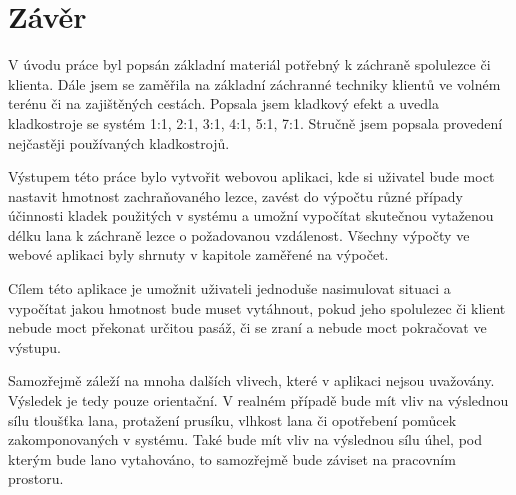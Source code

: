 \chapter*{Závěr}
\fancyhead{}
\def\figurename{Obr.} %
\def\tablename{Tab.} %
\def\figureautorefname{obr.} %
\def\tableautorefname{tab.} %
\def\chapterautorefname{kapitola} %

V úvodu práce byl popsán základní materiál potřebný k záchraně spolulezce či klienta. Dále jsem se zaměřila na základní záchranné techniky klientů ve volném terénu či na zajištěných cestách. Popsala jsem kladkový efekt a uvedla kladkostroje se systém 1:1, 2:1, 3:1, 4:1, 5:1, 7:1. Stručně jsem popsala provedení nejčastěji používaných kladkostrojů. 

Výstupem této práce bylo vytvořit webovou aplikaci, kde si uživatel bude moct nastavit hmotnost zachraňovaného lezce, zavést do výpočtu různé případy účinnosti kladek použitých v systému a umožní vypočítat skutečnou vytaženou délku lana k záchraně lezce o požadovanou vzdálenost. Všechny výpočty ve webové aplikaci byly shrnuty v kapitole zaměřené na výpočet.

Cílem této aplikace je umožnit uživateli jednoduše nasimulovat situaci a vypočítat jakou hmotnost bude muset vytáhnout, pokud jeho spolulezec či klient nebude moct překonat určitou pasáž, či se zraní a nebude moct pokračovat ve výstupu. 

Samozřejmě záleží na mnoha dalších vlivech, které v aplikaci nejsou uvažovány. Výsledek je tedy pouze orientační. V realném případě bude mít vliv na výslednou sílu tloušťka lana, protažení prusíku, vlhkost lana či opotřebení pomůcek zakomponovaných v systému. Také bude mít vliv na výslednou sílu úhel, pod kterým bude lano vytahováno, to samozřejmě bude záviset na pracovním prostoru. 
